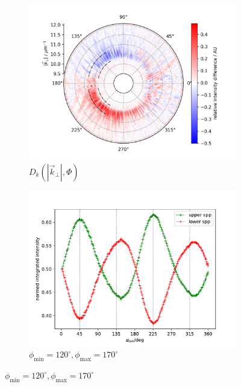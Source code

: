 \documentclass[titlepage,  ngerman]{article}
\begin{document}
		\begin{figure}			
			\begin{subfigure}[b]{0.5\textwidth}
				\centering
				\includegraphics[width=\textwidth]{figures/spin_hall/diff_back.png}
				\caption{$D_k\left(|\vec{k}_\perp|, \Phi\right)$}
				\label{fig:diff_back}
			\end{subfigure}
			\hfill
			\begin{subfigure}[b]{0.49\textwidth}
				\centering
				\includegraphics[width=\textwidth]{figures/spin_hall/intensity_back.pdf}
				\caption{$\phi_\mathrm{min} =120^\circ, \phi_\mathrm{max}=170^\circ$}
				\label{fig:intensity_back}
			\end{subfigure}
			

\end{figure}
\end{document}

